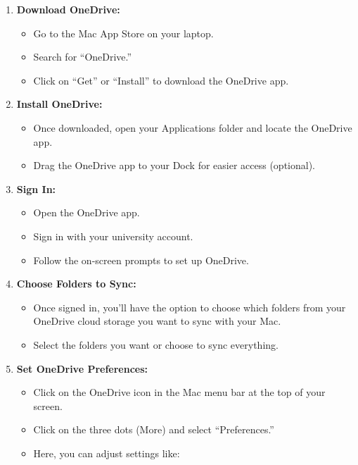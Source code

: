 \documentclass[
]{book}
\providecommand{\tightlist}{%
  \setlength{\itemsep}{0pt}\setlength{\parskip}{0pt}}
\theoremstyle{definition}
\theoremstyle{definition}
\theoremstyle{definition}
\theoremstyle{definition}
\theoremstyle{remark}
\begin{document}
\begin{enumerate}
\def\labelenumi{\arabic{enumi}.}
\tightlist
\item
  \textbf{Download OneDrive:}

  \begin{itemize}
  \tightlist
  \item
    Go to the Mac App Store on your laptop.
  \item
    Search for ``OneDrive.''
  \item
    Click on ``Get'' or ``Install'' to download the OneDrive app.
  \end{itemize}
\item
  \textbf{Install OneDrive:}

  \begin{itemize}
  \tightlist
  \item
    Once downloaded, open your Applications folder and locate the OneDrive app.
  \item
    Drag the OneDrive app to your Dock for easier access (optional).
  \end{itemize}
\item
  \textbf{Sign In:}

  \begin{itemize}
  \tightlist
  \item
    Open the OneDrive app.
  \item
    Sign in with your university account.
  \item
    Follow the on-screen prompts to set up OneDrive.
  \end{itemize}
\item
  \textbf{Choose Folders to Sync:}

  \begin{itemize}
  \tightlist
  \item
    Once signed in, you'll have the option to choose which folders from your OneDrive cloud storage you want to sync with your Mac.
  \item
    Select the folders you want or choose to sync everything.
  \end{itemize}
\item
  \textbf{Set OneDrive Preferences:}

  \begin{itemize}
  \tightlist
  \item
    Click on the OneDrive icon in the Mac menu bar at the top of your screen.
  \item
    Click on the three dots (More) and select ``Preferences.''
  \item
    Here, you can adjust settings like:


\end{itemize}
\end{enumerate}
\end{document}
